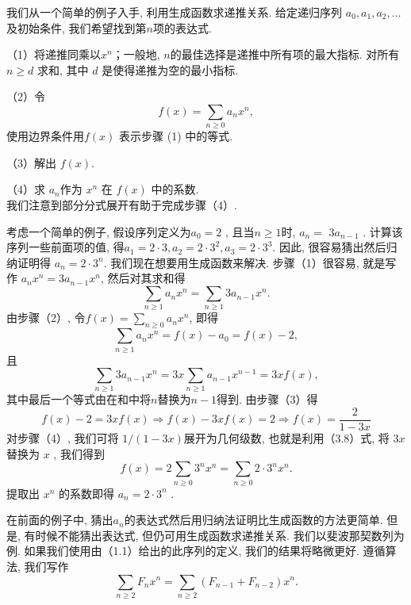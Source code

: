 \documentclass[a4paper,12pt]{ctexbook}
\begin{document}
我们从一个简单的例子入手, 利用生成函数求递推关系. 给定递归序列 $a_{0}, a_{1}, a_{2}, \ldots$ 及初始条件, 我们希望找到第$n$项的表达式.

（1）将递推同乘以$x^{n}$；一般地, $n$的最佳选择是递推中所有项的最大指标. 对所有 $n \geq d$ 求和, 其中 $d$ 是使得递推为空的最小指标.

（2）令
$$
f(x)=\sum_{n \geq 0} a_{n} x^{n},
$$使用边界条件用$f(x)$ 表示步骤 (1) 中的等式.

（3）解出 $f(x)$.

（4）求 $a_{n}$作为 $x^{n}$  在 $f(x)$  中的系数. \\
我们注意到部分分式展开有助于完成步骤（4）.

考虑一个简单的例子, 假设序列定义为$a_{0}=2$ , 且当$n \geq 1$时,  $a_{n}=$ $3 a_{n-1}$ . 计算该序列一些前面项的值, 得$a_{1}=2 \cdot 3, a_{2}=2 \cdot 3^{2}, a_{3}=2 \cdot 3^{3}$. 因此, 很容易猜出然后归纳证明得 $a_{n}=2 \cdot 3^{n}$. 我们现在想要用生成函数来解决. 步骤（1）很容易, 就是写作 $a_{n} x^{n}=3 a_{n-1} x^{n}$, 然后对其求和得
$$
\sum_{n \geq 1} a_{n} x^{n}=\sum_{n \geq 1} 3 a_{n-1} x^{n}.
$$
由步骤（2）, 令$f(x)=\sum_{n \geq 0} a_{n} x^{n}$, 即得
$$
\sum_{n \geq 1} a_{n} x^{n}=f(x)-a_{0}=f(x)-2,
$$且$$
\sum_{n \geq 1} 3 a_{n-1} x^{n}=3 x \sum_{n \geq 1} a_{n-1} x^{n-1}=3 x f(x),
$$其中最后一个等式由在和中将$n$替换为$n-1$得到. 由步骤（3）得
\[
f(x)-2=3 x f(x) \Longrightarrow f(x)-3 x f(x)=2 \Longrightarrow f(x)=\frac{2}{1-3 x}\tag{3.12}
\]
对步骤（4）, 我们可将 $1 /(1-3 x)$展开为几何级数, 也就是利用（3.8）式, 将 $3 x$ 替换为 $x$ , 我们得到
$$
f(x)=2 \sum_{n \geq 0} 3^{n} x^{n}=\sum_{n \geq 0} 2 \cdot 3^{n} x^{n} .
$$提取出 $x^{n}$ 的系数即得 $a_{n}=2 \cdot 3^{n}$ .

在前面的例子中, 猜出$a_{n}$的表达式然后用归纳法证明比生成函数的方法更简单. 但是, 有时候不能猜出表达式, 但仍可用生成函数求递推关系. 我们以斐波那契数列为例. 如果我们使用由（1.1）给出的此序列的定义, 我们的结果将略微更好. 遵循算法, 我们写作
$$
\sum_{n \geq 2} F_{n} x^{n}=\sum_{n \geq 2}\left(F_{n-1}+F_{n-2}\right) x^{n} .
$$
\end{document}
